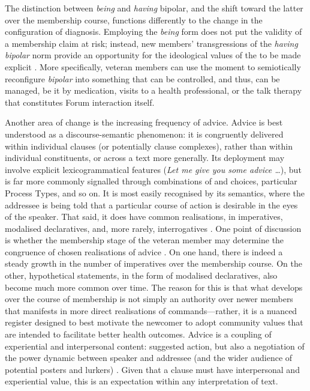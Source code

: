 The distinction between \emph{being} and \emph{having} \gls{bipolar}, and the shift toward the latter over the membership course, functions differently to the change in the configuration of diagnosis. Employing the \emph{being} form does not put the validity of a membership claim at risk; instead, new \glspl{member}' transgressions of the \emph{having bipolar} norm provide an opportunity for the ideological values of the  to be made explicit \cite{weber_missed_2011}. More specifically, veteran \glspl{member} can use the moment to semiotically reconfigure \emph{bipolar} into something that can be controlled, and thus, can be managed, be it by medication, visits to a health professional, or the talk therapy that constitutes \gls{Forum} interaction itself.

Another area of change is the increasing frequency of advice. Advice is best understood as a \gls{discourse-semantic} phenomenon: it is congruently delivered within individual clauses (or potentially clause complexes), rather than within individual constituents, or across a text more generally. Its deployment may involve explicit lexicogrammatical features (\emph{Let me give you some advice \dots}), but is far more commonly signalled through combinations of  and  choices, particular Process Types, and so on. It is most easily recognised by its semantics, where the addressee is being told that a particular course of action is desirable in the eyes of the speaker. That said, it does have common  realisations, in imperatives, modalised declaratives, and, more rarely, interrogatives \cite{locher2006advice}. One point of discussion is whether the membership stage of the veteran member may determine the congruence of chosen realisations of advice \cite{decapua_`if_1995}. On one hand, there is indeed a steady growth in the number of imperatives over the membership course. On the other, hypothetical statements, in the form of modalised declaratives, also become much more common over time. The reason for this is that what develops over the course of membership is not simply an authority over newer \glspl{member} that manifests in more direct realisations of commands---rather, it is a nuanced register designed to best motivate the newcomer to adopt community values that are intended to facilitate better health outcomes. Advice is a coupling of experiential and interpersonal content: suggested action, but also a negotiation of the power dynamic between speaker and addressee (and the wider audience of potential posters and lurkers) \cite{harrison2009politeness}. Given that a clause must have interpersonal and experiential value, this is an expectation within any  interpretation of text.

